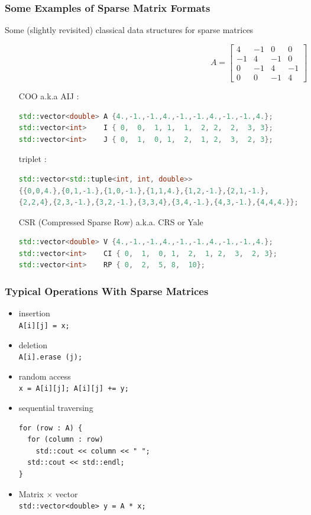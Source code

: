 \documentclass{beamer}
\begin{document}
\begin{frame}[fragile]
\frametitle{Some Examples of Sparse Matrix Formats}
Some (slightly revisited) classical data structures for sparse matrices

$$
A = 
\left[
\begin{array}{cccc}
4  & -1 & 0  & 0\\
-1 &  4 & -1 & 0\\
0  & -1 &  4 & -1\\
0  &  0 &  -1& 4
\end{array}
\right]
$$

\begin{itemize}
\item [COO] a.k.a AIJ :\\ \tiny
\begin{lstlisting}[language=C++]
std::vector<double> A {4.,-1.,-1.,4.,-1.,-1.,4.,-1.,-1.,4.};
std::vector<int>    I { 0,  0,  1, 1,  1,  2, 2,  2,  3, 3};
std::vector<int>    J { 0,  1,  0, 1,  2,  1, 2,  3,  2, 3};
\end{lstlisting} \normalsize
\item [triplet] :\\ \tiny
\begin{lstlisting}[language=C++]
std::vector<std::tuple<int, int, double>> 
{{0,0,4.},{0,1,-1.},{1,0,-1.},{1,1,4.},{1,2,-1.},{2,1,-1.},
{2,2,4},{2,3,-1.},{3,2,-1.},{3,3,4},{3,4,-1.},{4,3,-1.},{4,4,4.}};                                           
\end{lstlisting} \normalsize
\item [CSR] (Compressed Sparse Row) a.k.a. CRS or Yale\\ \tiny
\begin{lstlisting}[language=C++]
std::vector<double> V {4.,-1.,-1.,4.,-1.,-1.,4.,-1.,-1.,4.};
std::vector<int>    CI { 0,  1,  0, 1,  2,  1, 2,  3,  2, 3};
std::vector<int>    RP { 0,  2,  5, 8,  10};
\end{lstlisting} 
\end{itemize}
\end{frame}

\begin{frame}[fragile]
\frametitle{Typical Operations With Sparse Matrices} 
\begin{itemize}
\item insertion \\
\lstinline|A[i][j] = x;|
\item deletion \\
\lstinline|A[i].erase (j);|
\item random access \\
\lstinline|x = A[i][j]; A[i][j] += y;|
\item sequential traversing \\
\small\begin{lstlisting}
for (row : A) {
  for (column : row)
  	std::cout << column << " ";
  std::cout << std::endl;
}
\end{lstlisting}\normalsize
\item Matrix $\times$ vector\\
\lstinline|std::vector<double> y = A * x;|
\end{itemize}
\end{frame}
\end{document}
